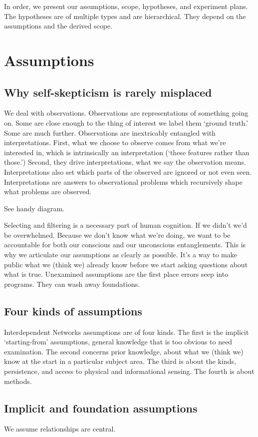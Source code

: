 \documentclass{article} %
\begin{document}
In order, we present our assumptions, scope, hypotheses, and experiment plans. The hypotheses are of multiple types and are hierarchical. They depend on the assumptions and the derived scope.

\pagebreak
\section{Assumptions}
\subsection{Why self-skepticism is rarely misplaced}
We deal with observations. Observations are representations of something going on. Some are close enough to the thing of interest we label them `ground truth.' Some are much further. Observations are inextricably entangled with interpretations. First, what we choose to observe comes from what  we're interested in, which is intrinsically an interpretation (`these features rather than those.') Second, they drive interpretations, what we say the observation means. Interpretations also set which parts of the observed are ignored or not even seen. Interpretations are answers to observational problems which recursively shape what problems are observed.

See handy diagram.

Selecting and filtering is a necessary part of human cognition. If we didn't we'd be overwhelmed. Because we don't know what we're doing, we want to be accountable for both our conscious and our unconscious entanglements. This is why we articulate our assumptions as clearly as possible. It's a way to make public what we (think we) already know before we start asking questions about what is true. Unexamined assumptions are the first place errors seep into programs. They can wash away foundations.

\subsection{Four kinds of assumptions}
Interdependent Networks assumptions are of four kinds. The first is the implicit `starting-from' assumptions, general knowledge that is too obvious to need examination. The second concerns prior knowledge, about what we (think we) know at the start in a particular subject area. The third is about the kinds, persistence, and access to physical and informational sensing. The fourth is about methods.

\subsection{Implicit and foundation assumptions}
We assume relationships are central. 
\end{document}
